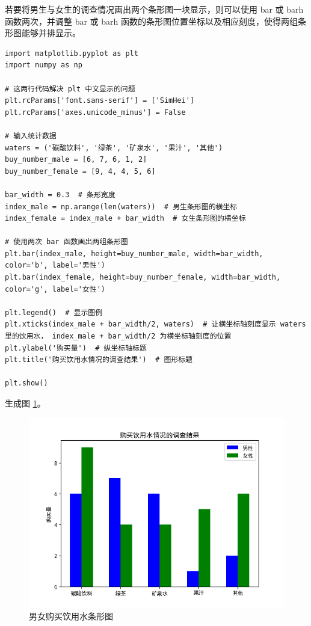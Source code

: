 若要将男生与女生的调查情况画出两个条形图一块显示，则可以使用 bar 或 barh 函数两次，并调整 bar 或 barh 函数的条形图位置坐标以及相应刻度，使得两组条形图能够并排显示。

\begin{lstlisting}[Language=Python]
import matplotlib.pyplot as plt
import numpy as np

# 这两行代码解决 plt 中文显示的问题
plt.rcParams['font.sans-serif'] = ['SimHei']
plt.rcParams['axes.unicode_minus'] = False

# 输入统计数据
waters = ('碳酸饮料', '绿茶', '矿泉水', '果汁', '其他')
buy_number_male = [6, 7, 6, 1, 2]
buy_number_female = [9, 4, 4, 5, 6]

bar_width = 0.3  # 条形宽度
index_male = np.arange(len(waters))  # 男生条形图的横坐标
index_female = index_male + bar_width  # 女生条形图的横坐标

# 使用两次 bar 函数画出两组条形图
plt.bar(index_male, height=buy_number_male, width=bar_width, color='b', label='男性')
plt.bar(index_female, height=buy_number_female, width=bar_width, color='g', label='女性')

plt.legend()  # 显示图例
plt.xticks(index_male + bar_width/2, waters)  # 让横坐标轴刻度显示 waters 里的饮用水， index_male + bar_width/2 为横坐标轴刻度的位置
plt.ylabel('购买量')  # 纵坐标轴标题
plt.title('购买饮用水情况的调查结果')  # 图形标题

plt.show()
\end{lstlisting}

生成图 \ref{fig:bar3}。
\begin{figure}[!ht]
  \centering
  \includegraphics[scale=0.8]{figure/bar3.png}
  \caption{男女购买饮用水条形图}\label{fig:bar3}
\end{figure}

